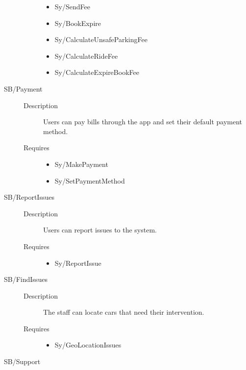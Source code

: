 \documentclass[11pt]{article} %
\begin{document}
\begin{description}
\begin{description}
		\begin{itemize}
			\item Sy/SendFee %
			\item Sy/BookExpire %
			\item Sy/CalculateUnsafeParkingFee %
			\item Sy/CalculateRideFee 
			\item Sy/CalculateExpireBookFee
		\end{itemize}
	\end{description}
	\item[SB/Payment] \hfill
	\begin{description}
		\item[Description] Users can pay bills through the app and set their default payment method.
		\item[Requires] \hfill
		\begin{itemize}
			\item Sy/MakePayment %
			\item Sy/SetPaymentMethod %
		\end{itemize}
	\end{description}
	\item[SB/ReportIssues] \hfill
	\begin{description}
		\item[Description] Users can report issues to the system.
		\item[Requires] \hfill
		\begin{itemize}
			\item Sy/ReportIssue %
		\end{itemize}
	\end{description}
	\item[SB/FindIssues] \hfill
	\begin{description}
		\item[Description] The staff can locate cars that need their intervention.
		\item[Requires] \hfill
		\begin{itemize}
			\item Sy/GeoLocationIssues %
		\end{itemize}
	\end{description}
	\item[SB/Support] \hfill
	\begin{description}

\end{description}
\end{description}
\end{document}

